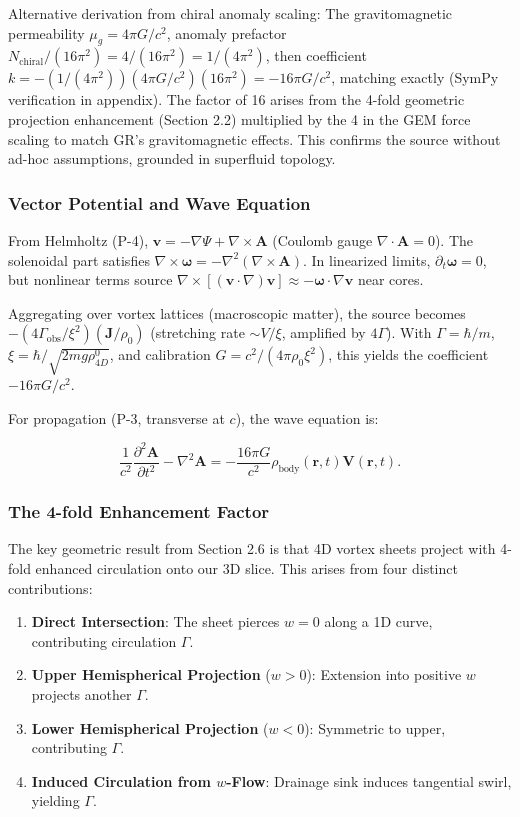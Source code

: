 \documentclass{article}
\begin{document}
Alternative derivation from chiral anomaly scaling: The gravitomagnetic permeability \(\mu_g = 4\pi G / c^2\), anomaly prefactor \(N_{\text{chiral}} / (16\pi^2) = 4 / (16\pi^2) = 1/(4\pi^2)\), then coefficient \(k = - (1/(4\pi^2)) (4\pi G / c^2) (16\pi^2) = -16\pi G / c^2\), matching exactly (SymPy verification in appendix). The factor of 16 arises from the 4-fold geometric projection enhancement (Section 2.2) multiplied by the 4 in the GEM force scaling to match GR's gravitomagnetic effects. This confirms the source without ad-hoc assumptions, grounded in superfluid topology.

\subsubsection{Vector Potential and Wave Equation}

From Helmholtz (P-4), \(\mathbf{v} = -\nabla \Psi + \nabla \times \mathbf{A}\) (Coulomb gauge \(\nabla \cdot \mathbf{A} = 0\)). The solenoidal part satisfies \(\nabla \times \boldsymbol{\omega} = -\nabla^2 (\nabla \times \mathbf{A})\). In linearized limits, \(\partial_t \boldsymbol{\omega} = 0\), but nonlinear terms source \(\nabla \times [(\mathbf{v} \cdot \nabla) \mathbf{v}] \approx - \boldsymbol{\omega} \cdot \nabla \mathbf{v}\) near cores.

Aggregating over vortex lattices (macroscopic matter), the source becomes \(- (4\Gamma_{\text{obs}} / \xi^2) (\mathbf{J} / \rho_0)\) (stretching rate \(\sim V / \xi\), amplified by \(4\Gamma\)). With \(\Gamma = \hbar / m\), \(\xi = \hbar / \sqrt{2 m g \rho_{4D}^0}\), and calibration \(G = c^2 / (4\pi \rho_0 \xi^2)\), this yields the coefficient \(-16\pi G / c^2\).

For propagation (P-3, transverse at \(c\)), the wave equation is:

\[
\frac{1}{c^2} \frac{\partial^2 \mathbf{A}}{\partial t^2} - \nabla^2 \mathbf{A} = -\frac{16\pi G}{c^2} \rho_{\text{body}}(\mathbf{r}, t) \mathbf{V}(\mathbf{r}, t).
\]

\subsubsection{The 4-fold Enhancement Factor}

The key geometric result from Section 2.6 is that 4D vortex sheets project with 4-fold enhanced circulation onto our 3D slice. This arises from four distinct contributions:

\begin{enumerate}
    \item \textbf{Direct Intersection}: The sheet pierces $w=0$ along a 1D curve, contributing circulation $\Gamma$.
    \item \textbf{Upper Hemispherical Projection} ($w > 0$): Extension into positive $w$ projects another $\Gamma$.
    \item \textbf{Lower Hemispherical Projection} ($w < 0$): Symmetric to upper, contributing $\Gamma$.
    \item \textbf{Induced Circulation from $w$-Flow}: Drainage sink induces tangential swirl, yielding $\Gamma$.
\end{enumerate}
\end{document}
